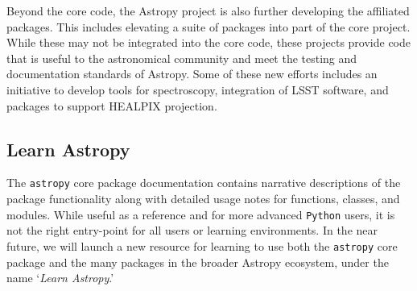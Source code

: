 \documentclass[modern]{aastex61}
\newcommand{\package}[1]{\texttt{#1}\xspace}
\newcommand{\python}{\package{Python}}
\newcommand{\astropy}{Astropy\xspace}
\newcommand{\astropypkg}{\package{astropy}}
\begin{document}
Beyond the core code, the \astropy project is also further developing the affiliated packages.  This includes elevating a suite of packages into part of the core project. While these may not be integrated into the core code, these projects provide code that is useful to the astronomical community and meet the testing and documentation standards of \astropy.   Some of these new efforts includes an initiative to develop tools for spectroscopy, integration of LSST software, and packages to support HEALPIX projection.

\subsection{Learn Astropy}

The \astropypkg core package documentation contains narrative descriptions of
the package functionality along with detailed usage notes for functions, classes, and modules.
While useful as a reference and for more advanced \python users, it is not the
right entry-point for all users or learning environments.
In the near future, we will launch a new resource for learning to use both the
\astropypkg core package and the many packages in the broader \astropy
ecosystem, under the name `\emph{Learn Astropy}.'
\end{document}
